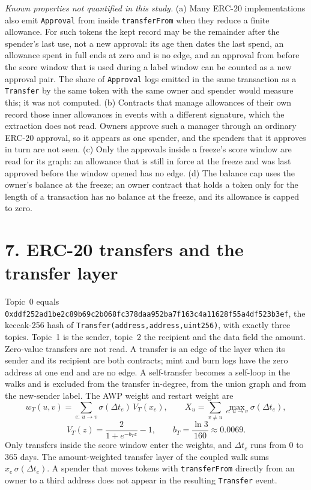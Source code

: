 \documentclass[10pt,letterpaper]{article}
\newcommand{\hash}[1]{\texttt{\small #1}}
\begin{document}
\textit{Known properties not quantified in this study.}
(a) Many ERC-20 implementations also emit \texttt{Approval} from inside \texttt{transferFrom} when they reduce a finite allowance. For such tokens the kept record may be the remainder after the spender's last use, not a new approval: its age then dates the last spend, an allowance spent in full ends at zero and is no edge, and an approval from before the score window that is used during a label window can be counted as a new approval pair. The share of \texttt{Approval} logs emitted in the same transaction as a \texttt{Transfer} by the same token with the same owner and spender would measure this; it was not computed.
(b) Contracts that manage allowances of their own record those inner allowances in events with a different signature, which the extraction does not read. Owners approve such a manager through an ordinary ERC-20 approval, so it appears as one spender, and the spenders that it approves in turn are not seen.
(c) Only the approvals inside a freeze's score window are read for its graph: an allowance that is still in force at the freeze and was last approved before the window opened has no edge.
(d) The balance cap uses the owner's balance at the freeze; an owner contract that holds a token only for the length of a transaction has no balance at the freeze, and its allowance is capped to zero.

\section*{7. ERC-20 transfers and the transfer layer}
Topic~0 equals \hash{0xddf252ad1be2c89b69c2b068fc378daa952ba7f163c4a11628f55a4df523b3ef}, the keccak-256 hash of \texttt{Transfer(address,address,uint256)}, with exactly three topics. Topic~1 is the sender, topic~2 the recipient and the data field the amount. Zero-value transfers are not read. A transfer is an edge of the layer when its sender and its recipient are both contracts; mint and burn logs have the zero address at one end and are no edge. A self-transfer becomes a self-loop in the walks and is excluded from the transfer in-degree, from the union graph and from the new-sender label. The AWP weight and restart weight are
\[
w_T(u,v)=\sum_{e:\,u\to v}\sigma(\Delta t_e)\,V_T(x_e),\qquad
X_u=\sum_{v\neq u}\max_{e:\,u\to v}\sigma(\Delta t_e),
\]
\[
V_T(z)=\frac{2}{1+e^{-b_T z}}-1,\qquad b_T=\frac{\ln 3}{160}\approx 0.0069 .
\]
Only transfers inside the score window enter the weights, and $\Delta t_e$ runs from 0 to 365 days. The amount-weighted transfer layer of the coupled walk sums $x_e\,\sigma(\Delta t_e)$. A spender that moves tokens with \texttt{transferFrom} directly from an owner to a third address does not appear in the resulting \texttt{Transfer} event.
\end{document}
